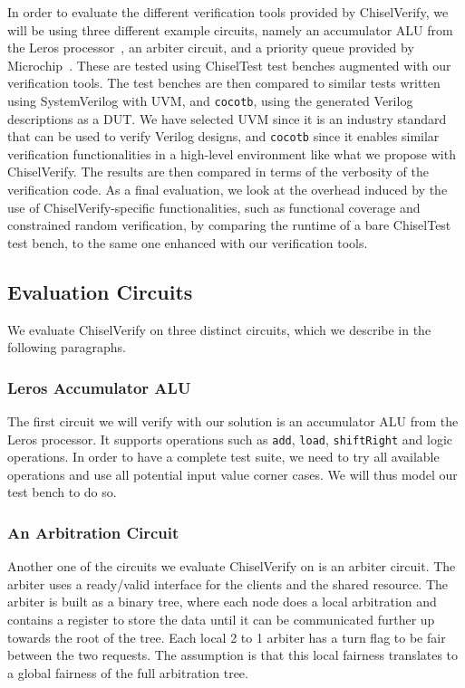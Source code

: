 \documentclass[conference]{IEEEtran}
\begin{document}
In order to evaluate the different verification tools provided by ChiselVerify, we will be using three different example circuits, namely an accumulator ALU from the Leros processor~\cite{leros:arcs2019}, an arbiter circuit, and a priority queue provided by Microchip~\cite{microchip}.
These are tested using ChiselTest test benches augmented with our verification tools.
The test benches are then compared to similar tests written using SystemVerilog with UVM, and \texttt{cocotb}, using the generated Verilog descriptions as a DUT.
We have selected UVM since it is an industry standard that can be used to verify Verilog designs, and \texttt{cocotb} since it enables similar verification functionalities in a high-level environment like what we propose with ChiselVerify.
The results are then compared in terms of the verbosity of the verification code.
As a final evaluation, we look at the overhead induced by the use of ChiselVerify-specific functionalities, such as functional coverage and constrained random verification, by comparing the runtime of a bare ChiselTest test bench, to the same one enhanced with our verification tools.

\subsection{Evaluation Circuits}
We evaluate ChiselVerify on three distinct circuits, which we describe in the following paragraphs.

\subsubsection{Leros Accumulator ALU}

The first circuit we will verify with our solution is an accumulator ALU from the Leros processor.
It supports operations such as \texttt{add}, \texttt{load}, \texttt{shiftRight} and logic operations. 
In order to have a complete test suite, we need to try all available operations and use all potential input value corner cases.
We will thus model our test bench to do so.

\subsubsection{An Arbitration Circuit}

Another one of the circuits we evaluate ChiselVerify on is an arbiter circuit.
The arbiter uses a ready/valid interface for the clients and the shared resource. 
The arbiter is built as a binary tree, where each node does a local arbitration
and contains a register to store the data until it can be communicated further up towards the root of the
tree. Each local 2 to 1 arbiter has a turn flag to be fair between the two requests. The assumption is that
this local fairness translates to a global fairness of the full arbitration tree.
\end{document}
